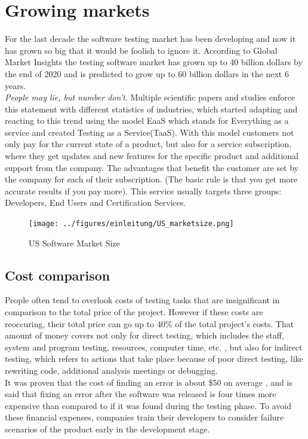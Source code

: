 \section{Growing markets}
For the last decade the software testing market has been developing and now it has grown so big that it would be foolish to ignore it. According to \dq Global Market Insights\dq{} the testing software market has grown up to 40 billion dollars by the end of 2020 and is predicted to grow up to 60 billion dollars in the next 6 years.\cite{GMI}\\
\textit{\dq People may lie, but number don't\dq}. Multiple scientific papers and studies enforce this statement with different statistics of industries, which started adapting and reacting to this trend using the model \dq EaaS \dq{} which stands for \dq Everything as a service\dq{} and created \dq Testing as a Service\dq{}(TaaS). With this model customers not only pay for the current state of a product, but also for a service subscription, where they get updates and new features for the specific product and additional support from the company. The advantages that benefit the customer are set by the company for each of their subscription. (The basic rule is that you get more accurate results if you pay more). This service usually targets three groups: Developers, End Users and Certification Services.\cite{10.1145/1807128.1807153} 
\begin{figure}[htbp]
	\centering
	\texttt{[image: ../figures/einleitung/US\_marketsize.png]}
	\caption{US Software Market Size\cite{GMI}}
	\label{US_marketsize_graph}
\end{figure}

\subsection{Cost comparison}
People often tend to overlook costs of testing tasks that are insignificant in comparison to the total price of the project. However if these costs are reoccuring, their total price can go up to 40\% of the total project's costs\cite{8822082}. That amount of money covers not only for direct testing, which includes the staff, system and program testing, resources, computer time, etc. , but also for indirect testing, which refers to actions that take place because of poor direct testing, like rewriting code, additional analysis meetings or debugging.\\
It was proven that the cost of finding an error is about \$50 on average \cite{10.1145/1010773.1010774}, and is said that fixing an error after the software was released is four times more expensive than compared to if it was found during the testing phase.\cite{10.1007/978-981-10-8848-3_46} To avoid these financial expenses, companies train their developers to consider failure scenarios of the product early in the development stage.

